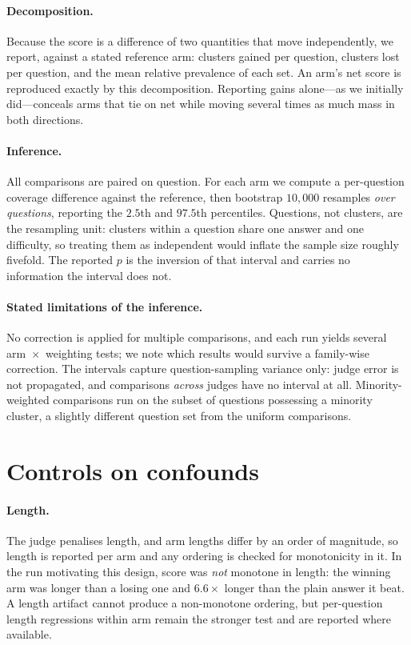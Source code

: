\documentclass[11pt]{article}
\theoremstyle{definition}
\begin{document}
\paragraph{Decomposition.} Because the score is a difference of two quantities
that move independently, we report, against a stated reference arm: clusters
gained per question, clusters lost per question, and the mean relative
prevalence of each set. An arm's net score is reproduced exactly by this
decomposition. Reporting gains alone---as we initially did---conceals arms that
tie on net while moving several times as much mass in both directions.

\paragraph{Inference.} All comparisons are paired on question. For each arm we
compute a per-question coverage difference against the reference, then bootstrap
$10{,}000$ resamples \emph{over questions}, reporting the $2.5$th and $97.5$th
percentiles. Questions, not clusters, are the resampling unit: clusters within a
question share one answer and one difficulty, so treating them as independent
would inflate the sample size roughly fivefold. The reported $p$ is the
inversion of that interval and carries no information the interval does not.

\paragraph{Stated limitations of the inference.} No correction is applied for
multiple comparisons, and each run yields several arm~$\times$~weighting tests;
we note which results would survive a family-wise correction. The intervals
capture question-sampling variance only: judge error is not propagated, and
comparisons \emph{across} judges have no interval at all. Minority-weighted
comparisons run on the subset of questions possessing a minority cluster, a
slightly different question set from the uniform comparisons.

\section{Controls on confounds}
\label{sec:confounds}

\paragraph{Length.} The judge penalises length, and arm lengths differ by an
order of magnitude, so length is reported per arm and any ordering is checked
for monotonicity in it. In the run motivating this design, score was
\emph{not} monotone in length: the winning arm was longer than a losing one and
$6.6\times$ longer than the plain answer it beat. A length artifact cannot
produce a non-monotone ordering, but per-question length regressions within arm
remain the stronger test and are reported where available.
\end{document}
